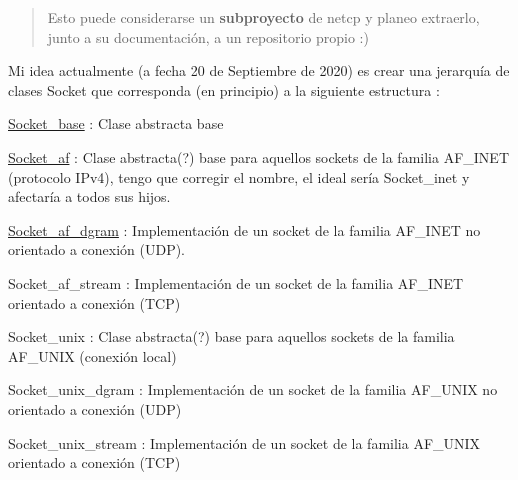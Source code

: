 \begin{quote}
Esto puede considerarse un {\bfseries subproyecto} de {\ttfamily netcp} y planeo extraerlo, junto a su documentación, a un repositorio propio \+:)~\newline
~\newline
 \end{quote}
Mi idea actualmente (a fecha 20 de Septiembre de 2020) es crear una jerarquía de clases Socket que corresponda (en principio) a la siguiente estructura \+:


\begin{DoxyItemize}
\item \hyperlink{classSocket__base}{Socket\+\_\+base} \+: Clase abstracta base
\begin{DoxyItemize}
\item \hyperlink{classSocket__af}{Socket\+\_\+af} \+: Clase abstracta(?) base para aquellos sockets de la familia A\+F\+\_\+\+I\+N\+ET (protocolo I\+Pv4), tengo que corregir el nombre, el ideal sería {\ttfamily Socket\+\_\+inet} y afectaría a todos sus hijos.
\begin{DoxyItemize}
\item \hyperlink{classSocket__af__dgram}{Socket\+\_\+af\+\_\+dgram} \+: Implementación de un socket de la familia A\+F\+\_\+\+I\+N\+ET no orientado a conexión (U\+DP).
\item Socket\+\_\+af\+\_\+stream \+: Implementación de un socket de la familia A\+F\+\_\+\+I\+N\+ET orientado a conexión (T\+CP)
\end{DoxyItemize}
\item Socket\+\_\+unix \+: Clase abstracta(?) base para aquellos sockets de la familia A\+F\+\_\+\+U\+N\+IX (conexión local)
\begin{DoxyItemize}
\item Socket\+\_\+unix\+\_\+dgram \+: Implementación de un socket de la familia A\+F\+\_\+\+U\+N\+IX no orientado a conexión (U\+DP)
\item Socket\+\_\+unix\+\_\+stream \+: Implementación de un socket de la familia A\+F\+\_\+\+U\+N\+IX orientado a conexión (T\+CP) 
\end{DoxyItemize}
\end{DoxyItemize}
\end{DoxyItemize}